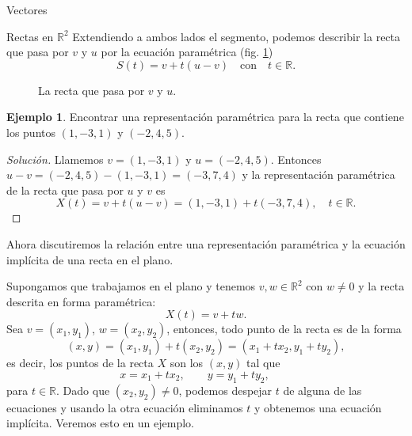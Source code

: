 \documentclass[a4paper,12pt,twoside,spanish]{amsbook}
\theoremstyle{definition}
\newtheorem{ejemplo}{Ejemplo}[section]
\theoremstyle{remark}
\newcommand{\R}{\mathbb R}
\begin{document}
\begin{chapter}{Vectores}
\begin{section}{Rectas en $\R^2$}
		Extendiendo a ambos lados el segmento, podemos describir la recta que pasa por $v$ y $u$ por la ecuación paramétrica (fig. \ref{fig-recta-entre-puntos})
		\begin{equation*}
		S(t) = v + t(u-v)\quad  \text{con}\quad t \in \R.
		\end{equation*}
		\begin{figure}[h]
			\caption{La recta que pasa por $v$ y $u$.}
			\label{fig-recta-entre-puntos}
		\end{figure} 
		
		\begin{ejemplo}
			Encontrar una representación paramétrica para la recta que contiene los puntos $(1, - 3, 1)$ y $(- 2,4,5)$.
		\end{ejemplo}	
		\begin{proof}[Solución] Llamemos $v = (1, - 3, 1)$ y $u =(- 2,4,5)$. Entonces $u-v = (- 2,4,5) - (1,-3,1) = (-3,7,4)$ y la representación paramétrica de la recta que pasa por $u$ y $v$  es 
		\begin{equation*}
			X (t) = v + t(u-v) = (1, -3,1) + t (-3, 7, 4),\quad t\in \R.
		\end{equation*}
		\end{proof}
	
		Ahora discutiremos la relación entre una representación paramétrica y la ecuación implícita de una recta en el plano.
		
		Supongamos que trabajamos en el plano y tenemos $v, w \in \R^2$ con $w \not= 0$ y la recta descrita en forma paramétrica:
		\begin{equation*}
		X(t) =v +tw.
		\end{equation*}
		Sea $v = (x_1,y_1)$, $w = (x_2,y_2)$,  entonces, todo punto de la recta es de la forma
		\begin{equation*}
		(x,y) =(x_1,y_1) +t(x_2,y_2) = (x_1+tx_2,y_1+ty_2),
		\end{equation*}
		es decir, los puntos de la recta $X$ son los $(x,y)$ tal que
		\begin{equation*}
			x = x_1+tx_2, \qquad y = y_1+ty_2, \qquad
		\end{equation*}
		para $t \in \R$. Dado  que $(x_2,y_2) \ne 0$, podemos despejar $t$  de alguna de las ecuaciones y usando la otra ecuación eliminamos $t$ y obtenemos una ecuación implícita. Veremos esto en un ejemplo.
		

\end{section}
\end{chapter}
\end{document}
